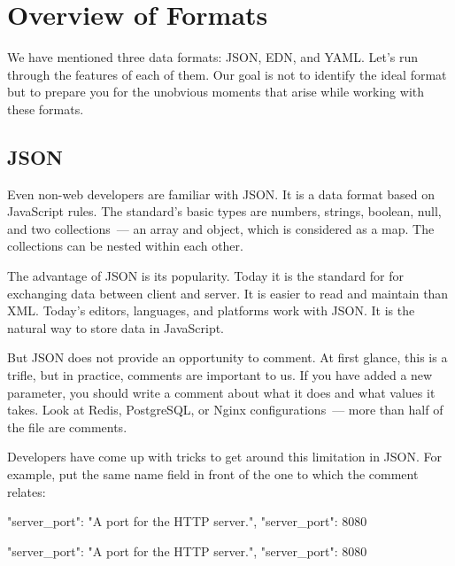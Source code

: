 \section{Overview of Formats}

We have mentioned three data formats: JSON, EDN, and YAML. Let's run through the features of each of them.  Our goal is not to identify the ideal format but to prepare you for the unobvious moments that arise while working with these formats.

\subsection{JSON}


Even non-web developers are familiar with JSON. It is a data format based on JavaScript rules. The standard's basic types are numbers, strings, boolean, null, and two collections~--- an array and object, which is considered as a map. The collections can be nested within each other.


The advantage of JSON is its popularity. Today it is the standard for for exchanging data between client and server.  It is easier to read and maintain than XML. Today's editors, languages, and platforms work with JSON. It is the natural way to store data in JavaScript.

But JSON does not provide an opportunity to comment. At first glance, this is a trifle, but in practice, comments are important to us. If you have added a new parameter, you should write a comment about what it does and what values it takes. Look at Redis, PostgreSQL, or Nginx configurations~--- more than half of the file are comments.

Developers have come up with tricks to get around this limitation in JSON.  For example, put the same name field in front of the one to which the comment relates:

\ifx\DEVICETYPE\MOBILE

\begin{json}
{
    "server_port":
    "A port for the HTTP server.",
    "server_port": 8080
}
\end{json}

\else

\begin{json}
{
    "server_port": "A port for the HTTP server.",
    "server_port": 8080
}
\end{json}

